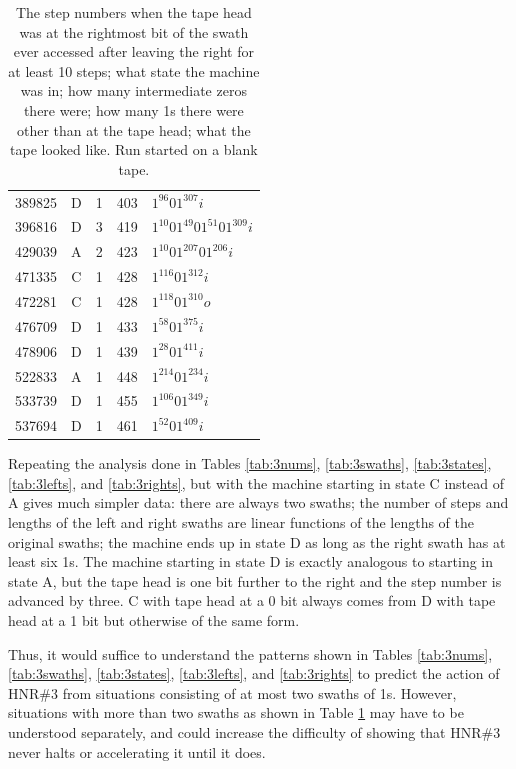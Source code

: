 \documentclass[12pt]{article}
\begin{document}
\begin{small}
\begin{table}[H]
\begin{Parallel}[c]{0.48\textwidth}{0.48\textwidth}
{{\begin{tabular}{rcccl}
389825&D&1&403&$1^{96}01^{307}i$\\
396816&D&3&419&$1^{10}01^{49}01^{51}01^{309}i$\\
429039&A&2&423&$1^{10}01^{207}01^{206}i$\\
471335&C&1&428&$1^{116}01^{312}i$\\
472281&C&1&428&$1^{118}01^{310}o$\\
476709&D&1&433&$1^{58}01^{375}i$\\
478906&D&1&439&$1^{28}01^{411}i$\\
522833&A&1&448&$1^{214}01^{234}i$\\
533739&D&1&455&$1^{106}01^{349}i$\\
537694&D&1&461&$1^{52}01^{409}i$\\
\end{tabular}}}
\end{Parallel}
\caption{\label{tab:3steps}The step numbers when the tape head was at the rightmost bit of the swath ever accessed after leaving the right for at least 10 steps; what state the machine was in; how many intermediate zeros there were; how many 1s there were other than at the tape head; what the tape looked like. Run started on a blank tape.}
\end{table}
\end{small}

\newpage
Repeating the analysis done in Tables \ref{tab:3nums}, \ref{tab:3swaths}, \ref{tab:3states}, \ref{tab:3lefts}, and \ref{tab:3rights}, but with the machine starting in state C instead of A gives much simpler data: there are always two swaths; the number of steps and lengths of the left and right swaths are linear functions of the lengths of the original swaths; the machine ends up in state D as long as the right swath has at least six 1s. The machine starting in state D is exactly analogous to starting in state A, but the tape head is one bit further to the right and the step number is advanced by three. C with tape head at a 0 bit always comes from D with tape head at a 1 bit but otherwise of the same form.

Thus, it would suffice to understand the patterns shown in Tables \ref{tab:3nums}, \ref{tab:3swaths}, \ref{tab:3states}, \ref{tab:3lefts}, and \ref{tab:3rights} to predict the action of HNR\#3 from situations consisting of at most two swaths of 1s. However, situations with more than two swaths as shown in Table \ref{tab:3steps} may have to be understood separately, and could increase the difficulty of showing that HNR\#3 never halts or accelerating it until it does.
\end{document}
